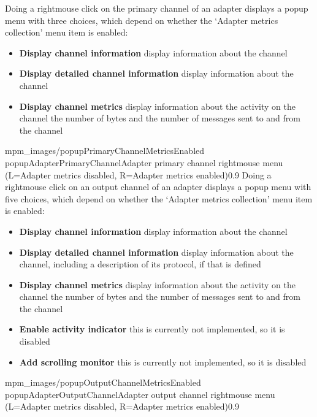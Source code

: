 Doing a right\longDash{}mouse click on the primary channel of an adapter displays a popup
menu with three choices, which depend on whether the `Adapter metrics collection' menu
item is enabled:
\begin{itemize}
\item\textbf{Display channel information} display information about the channel
\item\exSp\textbf{Display detailed channel information} display information about the
channel
\item\exSp\textbf{Display channel metrics} display information about the activity on the
channel \longDash{} the number of bytes and the number of messages sent to and from the
channel
\end{itemize}
%
{mpm_images/popupPrimaryChannelMetricsEnabled}%
{popupAdapterPrimaryChannel}{Adapter primary channel right\longDash{}mouse menu (L=Adapter
metrics disabled, R=Adapter metrics enabled)}{0.9}
\condPage{}
Doing a right\longDash{}mouse click on an output channel of an adapter displays a popup
menu with five choices, which depend on whether the `Adapter metrics collection' menu
item is enabled:
\begin{itemize}
\item\textbf{Display channel information} display information about the channel
\item\exSp\textbf{Display detailed channel information} display information about the
channel, including a description of its protocol, if that is defined
\item\exSp\textbf{Display channel metrics} display information about the activity on the
channel \longDash{} the number of bytes and the number of messages sent to and from the
channel
\item\exSp\textbf{Enable activity indicator} \longDash{} this is currently not
implemented, so it is disabled
\item\exSp\textbf{Add scrolling monitor} \longDash{} this is currently not implemented, so
it is disabled
\end{itemize}
%
{mpm_images/popupOutputChannelMetricsEnabled}%
{popupAdapterOutputChannel}{Adapter output channel right\longDash{}mouse menu (L=Adapter
metrics disabled, R=Adapter metrics enabled)}{0.9}

